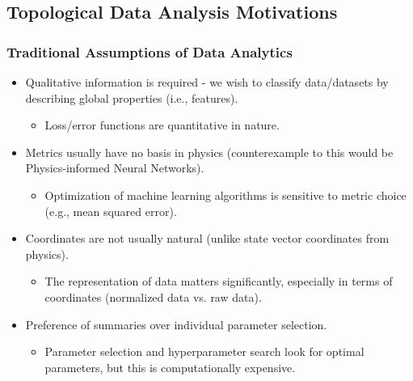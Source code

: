 	\subsection{Topological Data Analysis Motivations}
		\begin{frame}
		\frametitle{Traditional Assumptions of Data Analytics}
		\begin{itemize}
			\item Qualitative information is required - we wish to classify data/datasets by describing global properties (i.e., features).
				\begin{itemize}
					\item Loss/error functions are quantitative in nature.
				\end{itemize}
			\item Metrics usually have no basis in physics (counterexample to this would be Physics-informed Neural Networks).
				\begin{itemize}
					\item Optimization of machine learning algorithms is sensitive to metric choice (e.g., mean squared error).
				\end{itemize}
			\item Coordinates are not usually natural (unlike state vector coordinates from physics).
				\begin{itemize}
					\item The representation of data matters significantly, especially in terms of coordinates (normalized data vs. raw data).
				\end{itemize}
			\item Preference of summaries over individual parameter selection.
				\begin{itemize}
					\item Parameter selection and hyperparameter search look for optimal parameters, but this is computationally expensive.
				\end{itemize}
		\end{itemize}
		\end{frame}
		
